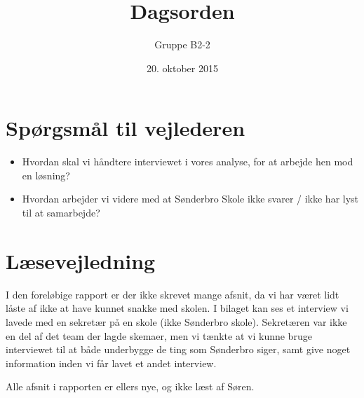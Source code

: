 \documentclass[hidelinks, 12pt]{article}
\newcommand{\group}{B2-2}
\begin{document}
	
	\title{Dagsorden}
	\author{Gruppe \group}
	\date{20. oktober 2015}
	\maketitle
	
	\section*{Spørgsmål til vejlederen}
	\begin{itemize}
		\item Hvordan skal vi håndtere interviewet i vores analyse, for at arbejde hen mod en løsning?
		\item Hvordan arbejder vi videre med at Sønderbro Skole ikke svarer / ikke har lyst til at samarbejde?
	\end{itemize}

	\section*{Læsevejledning}
	I den foreløbige rapport er der ikke skrevet mange afsnit, da vi har været lidt låste af ikke at have kunnet snakke med skolen. I bilaget kan ses et interview vi lavede med en sekretær på en skole (ikke Sønderbro skole). Sekretæren var ikke en del af det team der lagde skemaer, men vi tænkte at vi kunne bruge interviewet til at både underbygge de ting som Sønderbro siger, samt give noget information inden vi får lavet et andet interview.

	Alle afsnit i rapporten er ellers nye, og ikke læst af Søren.
\end{document}
